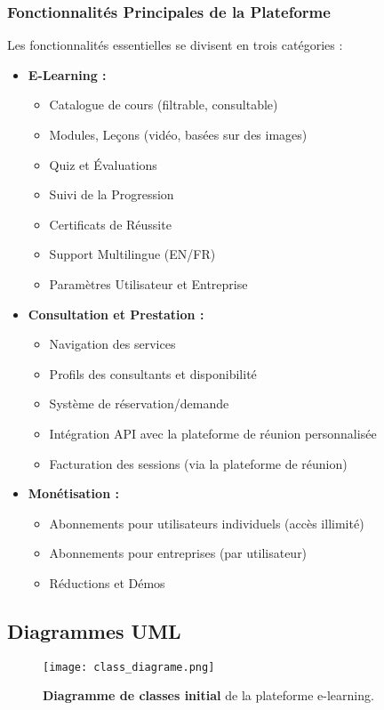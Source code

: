 \documentclass[12pt, a4paper]{article}
\begin{document}
\subsubsection{Fonctionnalités Principales de la Plateforme}
Les fonctionnalités essentielles se divisent en trois catégories :
\begin{itemize}
    \item \textbf{E-Learning :}
    \begin{itemize}
        \item Catalogue de cours (filtrable, consultable)
        \item Modules, Leçons (vidéo, basées sur des images)
        \item Quiz et Évaluations
        \item Suivi de la Progression
        \item Certificats de Réussite
        \item Support Multilingue (EN/FR)
        \item Paramètres Utilisateur et Entreprise
    \end{itemize}
    \item \textbf{Consultation et Prestation :}
    \begin{itemize}
        \item Navigation des services
        \item Profils des consultants et disponibilité
        \item Système de réservation/demande
        \item Intégration API avec la plateforme de réunion personnalisée
        \item Facturation des sessions (via la plateforme de réunion)
    \end{itemize}
    \item \textbf{Monétisation :}
    \begin{itemize}
        \item Abonnements pour utilisateurs individuels (accès illimité)
        \item Abonnements pour entreprises (par utilisateur)
        \item Réductions et Démos
    \end{itemize}
\end{itemize}

\subsection{Diagrammes UML}
\begin{figure}[h!]
  \centering
  \texttt{[image: class\_diagrame.png]}
  \caption{\textbf{Diagramme de classes initial} de la plateforme e-learning.}
  \label{fig:class_diagram}
\end{figure}
\end{document}

